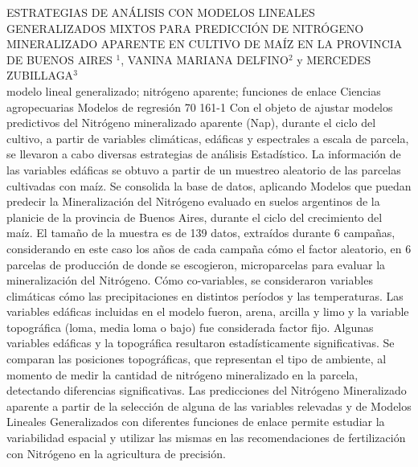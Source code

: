 \A
{ESTRATEGIAS DE ANÁLISIS CON MODELOS LINEALES GENERALIZADOS MIXTOS PARA PREDICCIÓN DE NITRÓGENO MINERALIZADO APARENTE EN CULTIVO DE MAÍZ EN LA PROVINCIA DE BUENOS AIRES}
{$^1$, VANINA MARIANA DELFINO$^2$ y MERCEDES ZUBILLAGA$^3$}
{
\\}
{modelo lineal generalizado; nitrógeno aparente; funciones de enlace} 
 {Ciencias agropecuarias} 
 {Modelos de regresión} 
 {70} 
 {161-1}
{Con el objeto de ajustar modelos predictivos del Nitrógeno mineralizado aparente (Nap), durante el ciclo del cultivo, a partir de variables climáticas, edáficas y espectrales a escala de parcela, se llevaron a cabo diversas estrategias de análisis Estadístico. La información de las variables edáficas se obtuvo a partir de un muestreo aleatorio de las parcelas cultivadas con maíz. Se consolida la base de datos, aplicando Modelos que puedan predecir la Mineralización del Nitrógeno evaluado en suelos argentinos de la planicie de la provincia de Buenos Aires, durante el ciclo del crecimiento del maíz. El tamaño de la muestra es de 139 datos, extraídos durante 6 campañas, considerando en este caso los años de cada campaña cómo el factor aleatorio, en 6 parcelas de producción de donde se escogieron, microparcelas para evaluar la mineralización del Nitrógeno. Cómo co-variables, se consideraron variables climáticas cómo las precipitaciones en distintos períodos y las temperaturas. Las variables edáficas incluidas en el modelo fueron, arena, arcilla y limo y la variable topográfica (loma, media loma o bajo) fue considerada factor fijo. Algunas variables edáficas y la topográfica resultaron estadísticamente significativas. Se comparan las posiciones topográficas, que representan el tipo de ambiente, al momento de medir la cantidad de nitrógeno mineralizado en la parcela, detectando diferencias significativas. Las predicciones del Nitrógeno Mineralizado aparente a partir de la selección de alguna de las variables relevadas y de Modelos Lineales Generalizados con diferentes funciones de enlace permite estudiar la variabilidad espacial y utilizar las mismas en las recomendaciones de fertilización con Nitrógeno en la agricultura de precisión.}
